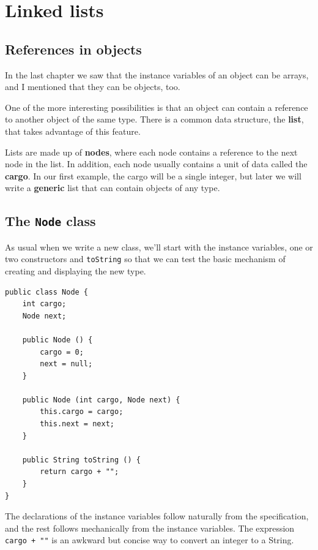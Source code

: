 \documentclass[12pt]{book}
\theoremstyle{exercise}
\begin{document}


\setcounter{tocdepth}{1}
\tableofcontents

\mainmatter

\chapter{Linked lists}
\label{list}

\section{References in objects}

In the last chapter we saw that the instance variables of an
object can be arrays, and I mentioned that they can be objects,
too.

One of the more interesting possibilities is that an object
can contain a reference to another object of the same type.
There is a common data structure, the {\bf list}, that takes advantage
of this feature.

Lists are made up of {\bf nodes}, where each node contains a
reference to the next node in the list.  In addition, each node
usually contains a unit of data called the {\bf cargo}.  In our
first example, the cargo will be a single integer, but later we
will write a {\bf generic} list that can contain objects
of any type.


\section{The {\tt Node} class}

As usual when we write a new class, we'll start with the instance
variables, one or two constructors and {\tt toString} so that we
can test the basic mechanism of creating and displaying the new
type.

\begin{verbatim}
public class Node {
    int cargo;
    Node next;

    public Node () {
        cargo = 0;
        next = null;
    }

    public Node (int cargo, Node next) {
        this.cargo = cargo;
        this.next = next;
    }

    public String toString () {
        return cargo + "";
    }
}
\end{verbatim}
%
The declarations of the instance variables follow naturally
from the specification, and the rest follows mechanically from
the instance variables.  The expression {\tt cargo + ""} is
an awkward but concise way to convert an integer to a String.
\end{document}
